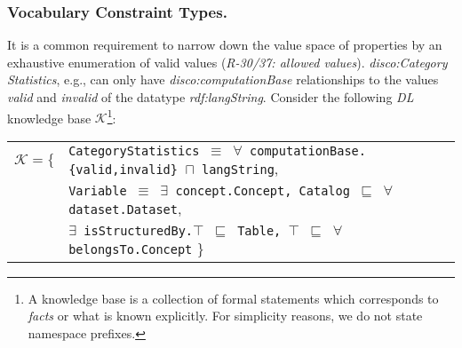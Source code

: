 \documentclass{llncs}
\newcommand{\ms}[1]{\texttt{#1}}
\newenvironment{DL}{
  \small
  \vspace{0cm}
	\begin{center}
  \begin{tabular}{c l}

}{
  \end{tabular}
	\end{center}
}
\begin{document}
\subsubsection*{Vocabulary Constraint Types.}
It is a common requirement to narrow down the value space of properties by an exhaustive enumeration of valid values (\emph{R-30/37: allowed values}). 
\emph{disco:Category} \emph{Statistics}, e.g., can only have \emph{disco:computationBase} relationships to the values \emph{valid} and \emph{invalid} of the datatype \emph{rdf:langString}.
Consider the following \emph{DL} knowledge base $\mathcal{K}$\footnote{A knowledge base is a collection of formal statements which corresponds to \emph{facts} or what is known explicitly. For simplicity reasons, we do not state namespace prefixes.}:
\begin{center}
\begin{DL} 
$\mathcal{K}=\{$ 
	&\ms{CategoryStatistics $\equiv$ $\forall$ computationBase.\{valid,invalid\} $\sqcap$ langString}, \\
  &\ms{Variable $\equiv$ $\exists$ concept.Concept, Catalog $\sqsubseteq$ $\forall$ dataset.Dataset}, \\
  &\ms{$\exists$ isStructuredBy.$\top$ $\sqsubseteq$ Table, $\top$ $\sqsubseteq$ $\forall$ belongsTo.Concept}
\}\\ 
\end{DL}
\end{center}
\end{document}
